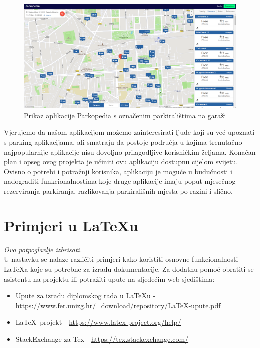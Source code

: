 		\begin{figure}[H]
			\includegraphics[width=\textwidth]{slike/parkopedia_garage.PNG} %
			\caption{Prikaz aplikacije Parkopedia s označenim parkiralištima na garaži}
			\label{fig:promjene5} %
		\end{figure}
		
		Vjerujemo da našom aplikacijom možemo zainteresirati ljude koji su već upoznati s parking aplikacijama, ali smatraju da postoje područja u kojima trenutačno najpopularnije aplikacije nisu dovoljno prilagodljive korisničkim željama. Konačan plan i opseg ovog projekta je učiniti ovu aplikaciju dostupnu cijelom svijetu. Ovisno o potrebi i potražnji korisnika, aplikaciju je moguće u budućnosti i nadograditi funkcionalnostima koje druge aplikacije imaju poput mjesečnog rezerviranja parkiranja, razlikovanja parkirališnih mjesta po razini i slično.

		
		\section{Primjeri u \LaTeX u}
		
		\textit{Ovo potpoglavlje izbrisati.}\\

		U nastavku se nalaze različiti primjeri kako koristiti osnovne funkcionalnosti \LaTeX a koje su potrebne za izradu dokumentacije. Za dodatnu pomoć obratiti se asistentu na projektu ili potražiti upute na sljedećim web sjedištima:
		\begin{itemize}
			\item Upute za izradu diplomskog rada u \LaTeX u - \url{https://www.fer.unizg.hr/_download/repository/LaTeX-upute.pdf}
			\item \LaTeX\ projekt - \url{https://www.latex-project.org/help/}
			\item StackExchange za Tex - \url{https://tex.stackexchange.com/}\\
		
		\end{itemize} 	


